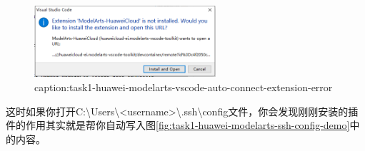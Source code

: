 \begin{figure}[htbp]
	\centering
	\includegraphics[width=0.6\textwidth]{figures/task1-huawei-modelarts-vscode-auto-connect-extension-error.png}
	\caption{caption:task1-huawei-modelarts-vscode-auto-connect-extension-error}
	\label{fig:task1-huawei-modelarts-vscode-auto-connect-extension-error}
\end{figure}

这时如果你打开C:\textbackslash Users\textbackslash <username>\textbackslash .ssh\textbackslash config文件，你会发现刚刚安装的插件的作用其实就是帮你自动写入图\ref{fig:task1-huawei-modelarts-ssh-config-demo}中的内容。